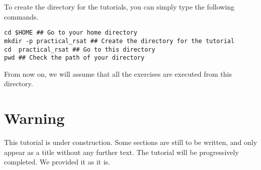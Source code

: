 To create the directory for the tutorials, you can simply type the
following commands.

\begin{lstlisting}
cd $HOME ## Go to your home directory
mkdir -p practical_rsat ## Create the directory for the tutorial
cd  practical_rsat ## Go to this directory
pwd ## Check the path of your directory
\end{lstlisting}

From now on, we will assume that all the exercises are executed
from this directory.


\section{Warning}

This tutorial is under construction. Some sections are still to be
written, and only appear as a title without any further text. The
tutorial will be progressively completed. We provided it as it is.
